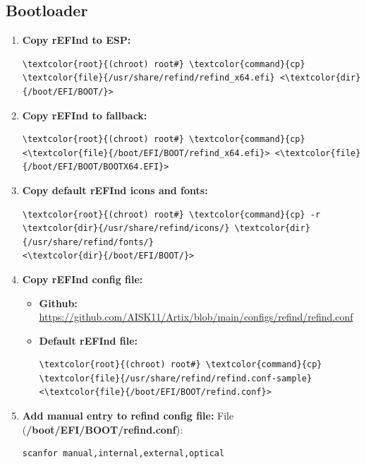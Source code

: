 \documentclass[10pt, a4paper, onecolumn, oneside, titlepage, openany]{book}
\begin{document}
\subsection{Bootloader}
\begin{enumerate}
    \item \textbf{Copy rEFInd to ESP:}
\begin{Verbatim}[commandchars=\\\{\}]
\textcolor{root}{(chroot) root#} \textcolor{command}{cp} \textcolor{file}{/usr/share/refind/refind_x64.efi} <\textcolor{dir}{/boot/EFI/BOOT/}>
\end{Verbatim}
    \item \textbf{Copy rEFInd to fallback:}
\begin{Verbatim}[commandchars=\\\{\}]
\textcolor{root}{(chroot) root#} \textcolor{command}{cp} <\textcolor{file}{/boot/EFI/BOOT/refind_x64.efi}> <\textcolor{file}{/boot/EFI/BOOT/BOOTX64.EFI}>
\end{Verbatim}
    \item \textbf{Copy default rEFInd icons and fonts:}
\begin{Verbatim}[commandchars=\\\{\}]
\textcolor{root}{(chroot) root#} \textcolor{command}{cp} -r \textcolor{dir}{/usr/share/refind/icons/} \textcolor{dir}{/usr/share/refind/fonts/}
<\textcolor{dir}{/boot/EFI/BOOT/}>
\end{Verbatim}
    \item \textbf{Copy rEFInd config file:}
    \begin{itemize}
        \item \textbf{Github:}
\newline \url{https://github.com/AISK11/Artix/blob/main/configs/refind/refind.conf}
        \item \textbf{Default rEFInd file:}
\begin{Verbatim}[commandchars=\\\{\}]
\textcolor{root}{(chroot) root#} \textcolor{command}{cp} \textcolor{file}{/usr/share/refind/refind.conf-sample}
<\textcolor{file}{/boot/EFI/BOOT/refind.conf}>
\end{Verbatim}
    \end{itemize}
    \item \textbf{Add manual entry to refind config file:}
\newline File (\textbf{\textcolor{file}{/boot/EFI/BOOT/refind.conf}}):
\begin{Verbatim}[commandchars=\\\{\}]
scanfor manual,internal,external,optical


\end{Verbatim}
\end{enumerate}
\end{document}
